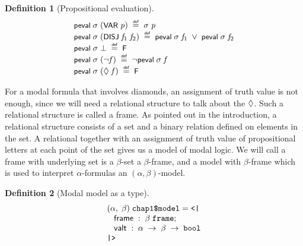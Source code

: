 \documentclass[letterpaper]{article}
\newtheorem{defn}{Definition}
\renewcommand{\HOLConst}[1]{{\textsf{\upshape\small #1}}}
\renewcommand{\HOLinline}[1]{\ensuremath{#1}}
\newenvironment{holmath}{\begin{displaymath}\begin{array}{l}}{\end{array}\end{displaymath}\ignorespacesafterend}
\begin{document}
\begin{defn}[Propositional evaluation]
\begin{holmath}
  \HOLConst{peval}\;\HOLFreeVar{\ensuremath{\sigma}}\;(\HOLConst{VAR}\;\HOLFreeVar{p})\;\HOLSymConst{\HOLTokenDefEquality{}}\;\HOLFreeVar{\ensuremath{\sigma}}\;\HOLFreeVar{p}\\
\HOLConst{peval}\;\HOLFreeVar{\ensuremath{\sigma}}\;(\HOLConst{DISJ}\;\HOLFreeVar{f\sb{\mathrm{1}}}\;\HOLFreeVar{f\sb{\mathrm{2}}})\;\HOLSymConst{\HOLTokenDefEquality{}}\;\HOLConst{peval}\;\HOLFreeVar{\ensuremath{\sigma}}\;\HOLFreeVar{f\sb{\mathrm{1}}}\;\HOLSymConst{\HOLTokenDisj{}}\;\HOLConst{peval}\;\HOLFreeVar{\ensuremath{\sigma}}\;\HOLFreeVar{f\sb{\mathrm{2}}}\\
\HOLConst{peval}\;\HOLFreeVar{\ensuremath{\sigma}}\;\HOLSymConst{\ensuremath{\bot}}\;\HOLSymConst{\HOLTokenDefEquality{}}\;\HOLConst{F}\\
\HOLConst{peval}\;\HOLFreeVar{\ensuremath{\sigma}}\;(\HOLSymConst{\HOLTokenNeg{}}\HOLFreeVar{f})\;\HOLSymConst{\HOLTokenDefEquality{}}\;\HOLSymConst{\HOLTokenNeg{}}\HOLConst{peval}\;\HOLFreeVar{\ensuremath{\sigma}}\;\HOLFreeVar{f}\\
\HOLConst{peval}\;\HOLFreeVar{\ensuremath{\sigma}}\;(\HOLSymConst{\ensuremath{\Diamond}}\;\HOLFreeVar{f})\;\HOLSymConst{\HOLTokenDefEquality{}}\;\HOLConst{F}
\end{holmath}
\end{defn}

For a modal formula that involves diamonds, an assignment of truth value is not enough, since we will need a relational structure to talk about the \HOLinline{\HOLSymConst{\ensuremath{\Diamond}}}. Such a relational structure is called a frame. As pointed out in the introduction, a relational structure consists of a set and a binary relation defined on elements in the set. A relational together with an assignment of truth value of propositional letters at each point of the set gives us a model of modal logic.  We will call a frame with underlying set is a $\beta$-set a $\beta$-frame, and a model with $\beta$-frame which is used to interpret $\alpha$-formulas an $(\alpha,\beta)$-model.

\begin{defn}[Modal model as a type]
\begin{holmath}
  (\ensuremath{\alpha},\;\ensuremath{\beta})\;\HOLTyOp{chap1\$model} = \HOLTokenLeftrec{}\\
\;\;\;\HOLFieldName{frame}\;:\;\ensuremath{\beta}\;\HOLTyOp{frame};\\
\;\;\;\HOLFieldName{valt}\;:\;\ensuremath{\alpha}\;\ensuremath{\rightarrow}\;\ensuremath{\beta}\;\ensuremath{\rightarrow}\;\HOLTyOp{bool}\\
\HOLTokenRightrec{}
\end{holmath}
\end{defn}
\end{document}
